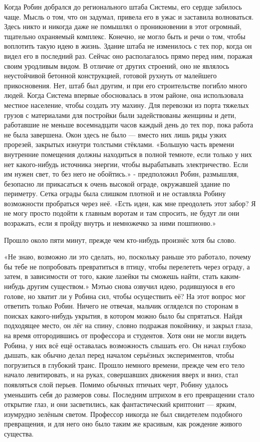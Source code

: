 \documentclass[a4paper,12pt]{book}
\begin{document}
	Когда Робин добрался до регионального штаба Системы, его сердце забилось чаще. Мысль о том, что он задумал, привела его в ужас и заставила волноваться. Здесь никто и никогда даже не помышлял о проникновении в этот огромный, тщательно охраняемый комплекс. Конечно, не могло быть и речи о том, чтобы воплотить такую идею в жизнь.
	Здание штаба не изменилось с тех пор, когда он видел его в последний раз. Сейчас оно располагалось прямо перед ним, поражая своим уродливым видом. В отличие от других строений, оно не являлось неустойчивой бетонной конструкцией, готовой рухнуть от малейшего прикосновения. Нет, штаб был другим, и при его строительстве погибло много людей.
	Когда Система впервые обосновалась в этом районе, она использовала местное население, чтобы создать эту махину. Для перевозки из порта тяжелых грузов с материалами для постройки были задействованы женщины и дети, работавшие не меньше восемнадцати часов каждый день до тех пор, пока работа не была завершена. Окон здесь не было — вместо них лишь ряды узких прорезей, закрытых изнутри толстыми стёклами.
	«Большую часть времени внутренние помещения должны находиться в полной темноте, если только у них нет какого-нибудь источника энергии, чтобы вырабатывать электричество. Если им нужен свет, то без него не обойтись.» - предположил Робин, размышляя, безопасно ли прикасаться к очень высокой ограде, окружавшей здание по периметру. Сетка ограды была слишком плотной и не оставляла Робину возможности пробраться через неё.
	«Есть идеи, как мне преодолеть этот забор? Я не могу просто подойти к главным воротам и там спросить, не будут ли они возражать, если я пройду внутрь и немножечко за ними пошпионю.»

	Прошло около пяти минут, прежде чем кто-нибудь произнёс хотя бы слово.

	«Не знаю, возможно ли это сделать, но, поскольку раньше это работало, почему бы тебе не попробовать превратиться в птицу, чтобы перелететь через ограду, а затем, в зависимости от того, какие лазейки ты сможешь найти, стать каким-нибудь другим существом.»
	Мэтью снова озвучил идею, родившуюся в его голове, но хватит ли у Робина сил, чтобы осуществить её? На этот вопрос мог ответить только Робин. Ничего не отвечая, мальчик огляделся по сторонам в поисках какого-нибудь укрытия, в котором можно было бы спрятаться.
	Найдя подходящее место, он лёг на спину, словно подражая покойнику, и закрыл глаза, на время отгородившись от профессора и студентов. Хотя они не могли видеть Робина, у них всё ещё оставалась возможность слышать его. Он начал глубоко дышать, как обычно делал перед началом серьёзных экспериментов, чтобы погрузиться в глубокий транс. Прошло немного времени, прежде чем его тело начало левитировать, и на руках, совершавших движения вверх и вниз, стал появляться слой перьев. Помимо обычных птичьих черт, Робину удалось уменьшить себя до размеров совы. Последним штрихом в его превращении стало открытие глаз, и они засветились, как фантастический криптонит — ярким, изумрудно зелёным светом. Профессор никогда не был свидетелем подобного превращения, и для него оно было таким же красивым, как рождение живого существа.
\end{document}
